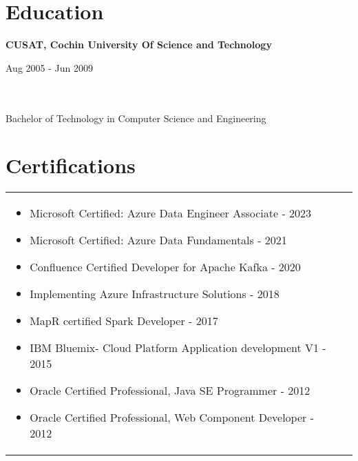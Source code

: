 \documentclass[a4paper,8pt]{article}
\begin{document}
\section{Education}
\begin{minipage}[b]{0.5\textwidth}
\raggedright
\textbf {CUSAT, Cochin University Of Science and Technology} 
\end{minipage}%
\begin{minipage}[b]{0.5\textwidth}
\raggedleft
Aug 2005 - Jun 2009 
\end{minipage} \\
\\
Bachelor of Technology in Computer Science and Engineering


\section{Certifications}
\begin{tabularx}{\linewidth}{ @{}l r@{} }
\begin{minipage}[t]{\linewidth}
    \begin{itemize}[nosep,after=\strut, leftmargin=2em, itemsep=2pt]
        \item Microsoft Certified: Azure Data Engineer Associate - 2023
        \item Microsoft Certified: Azure Data Fundamentals - 2021
        \item Confluence Certified Developer for Apache Kafka - 2020
        \item Implementing Azure Infrastructure Solutions - 2018
        \item MapR certified Spark Developer - 2017
        \item IBM Bluemix- Cloud Platform Application development V1 - 2015
        \item Oracle Certified Professional, Java SE Programmer - 2012
        \item Oracle Certified Professional, Web Component Developer - 2012
    \end{itemize}
\end{minipage}
\end{tabularx}
\end{document}
